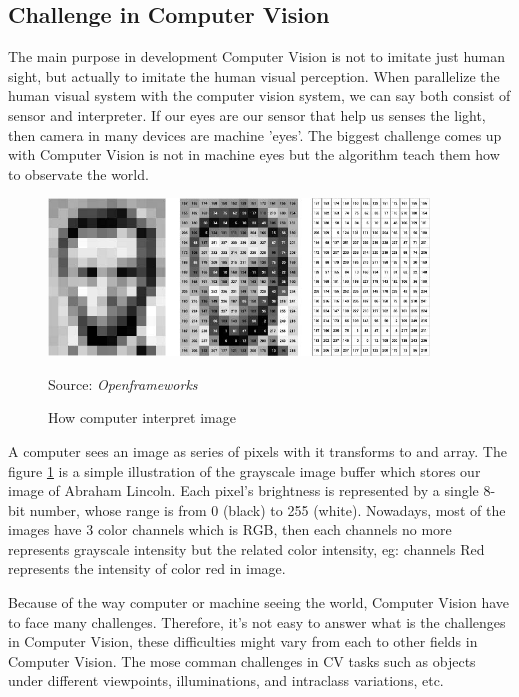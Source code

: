 \documentclass[12pt]{article}
\newcommand{\source}[1]{\caption*{Source: \emph{#1}} }
\begin{document}
\subsection{Challenge in Computer Vision}
\label{sec:challenges}
The main purpose in development Computer Vision is not to imitate just human sight, but actually
to imitate the human visual perception. When parallelize the human visual system with 
the computer vision system, we can say both consist of sensor and interpreter. If our eyes
are our sensor that help us senses the light, then camera in many devices are machine 'eyes'.
The biggest challenge comes up with Computer Vision is not in machine eyes but the algorithm
teach them how to observate the world. 

\begin{figure}[htp]
    \centering
    \includegraphics[width=0.9\textwidth]{images/how-computer-interpret-image.jpg}
    \caption{How computer interpret image}
    \label{fig:computer_image}
    \source{Openframeworks}
\end{figure}

A computer sees an image as series of pixels with it transforms to and array. 
The figure \ref{fig:computer_image} is a simple illustration of the grayscale image 
buffer which stores our image of Abraham Lincoln. 
Each pixel’s brightness is represented by a single 8-bit number, 
whose range is from 0 (black) to 255 (white). Nowadays, most of the images have 3
color channels which is RGB, then each channels no more represents grayscale intensity
but the related color intensity, eg: channels Red represents the intensity of color red 
in image. 

Because of the way computer or machine seeing the world, Computer Vision have to face 
many challenges. Therefore, it's not easy to answer what is the challenges in Computer 
Vision, these difficulties might vary from each to other fields in Computer Vision. 
The mose comman challenges in CV tasks such as objects under different viewpoints, 
illuminations, and intraclass variations, etc. 
\end{document}
